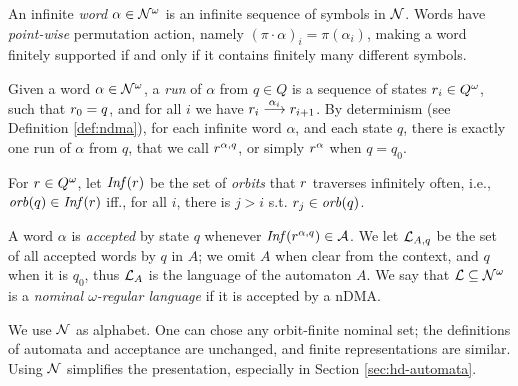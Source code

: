 \begin{definition}
\label{def:inf-word}
 An infinite \emph{word} $\alpha \in \mathcal{N}^\omega$ is an infinite sequence of symbols in $\mathcal{N}$. Words have \emph{point-wise} permutation action, namely $(\pi \cdot \alpha)_i = \pi(\alpha_i)$, making a word finitely supported if and only if it contains finitely many different symbols. 
\end{definition}

\begin{definition}\label{def:nominal-run}
 Given a word $\alpha \in \mathcal{N}^\omega$, a \emph{run} of $\alpha$ from $q \in Q$ is a sequence of states $r_i \in Q^\omega$, such that $r_0 = q$, and for all $i$ we have $r_i \overset{\alpha_i}{\longrightarrow} r_{i+1}$. 
 By determinism (see Definition \ref{def:ndma}), for each infinite word $\alpha$, and each state $q$, there is exactly one run of $\alpha$ from $q$, that we call $r^{\alpha,q}$, or simply $r^{\alpha}$ when $q=q_0$.
\end{definition}

\begin{definition}\label{def:inf-set}
 For $r \in Q^\omega$, let $\mathit{Inf}(r)$ be the set of \emph{orbits} that $r$ traverses infinitely often, i.e., $\mathit{orb}(q) \in \mathit{Inf}(r)$ iff., for all $i$, there is $j > i$ s.t. $r_j \in \mathit{orb}(q)$.
\end{definition}

\begin{definition}
 A word $\alpha$ is \emph{accepted} by state $q$ whenever $\mathit{Inf}(r^{\alpha,q}) \in \mathcal{A}$. We let $\mathcal{L}_{A,q}$ be the set of all accepted words by $q$ in $A$; we omit $A$ when clear from the context, and $q$ when it is $q_0$, thus $\mathcal{L}_A$ is the language of the automaton $A$. We say that $\mathcal{L} \subseteq \mathcal{N}^\omega$ is a \emph{nominal $\omega$-regular language} if it is accepted by a nDMA.
\end{definition}

\begin{remark}\label{rem:simple-alphabet} We use $\mathcal{N}$ as alphabet. One can chose any orbit-finite nominal set; the definitions of automata and acceptance are unchanged, and finite representations are similar.
%
Using $\mathcal{N}$ simplifies the presentation, especially in Section \ref{sec:hd-automata}.
\end{remark}

